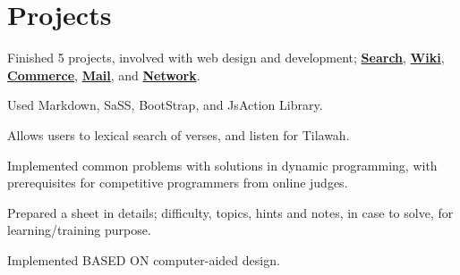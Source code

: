 \documentclass[]{deedy-resume-openfont}
\begin{document}
\begin{minipage}[t]{0.66\textwidth}

\section{Projects}

\begin{tightemize}
    \item Finished 5 projects, involved with web design and development; \href{https://github.com/ahr9n/cs50w-search}{\textbf{Search}}, \href{https://github.com/ahr9n/cs50w-wiki}{\textbf{Wiki}}, \href{https://github.com/ahr9n/cs50w-commerce}{\textbf{Commerce}}, \href{https://github.com/ahr9n/cs50w-mail}{\textbf{Mail}}, and \href{https://github.com/ahr9n/cs50w-network}{\textbf{Network}}.
    \item Used Markdown, SaSS, BootStrap, and JsAction Library.
\end{tightemize}
\sectionsep

\href{https://github.com/ahr9n/quran-api}{}
\begin{tightemize}
    \item Allows users to lexical search of verses, and listen for Tilawah.\\
\end{tightemize}
\sectionsep

\href{https://github.com/ahr9n/psolving-paradigms}{}
\begin{tightemize}
    \item Implemented common problems with solutions in dynamic programming, with prerequisites for competitive programmers from online judges.
    \item Prepared a sheet in details; difficulty, topics, hints and notes, in case to solve, for learning/training purpose.
\end{tightemize}
\sectionsep


\href{https://github.com/ahr9n/electrical-network-analyzer}{}
\begin{tightemize}
    \item Implemented BASED ON computer-aided design. \\
\end{tightemize}
\sectionsep


\end{minipage}
\end{document}
